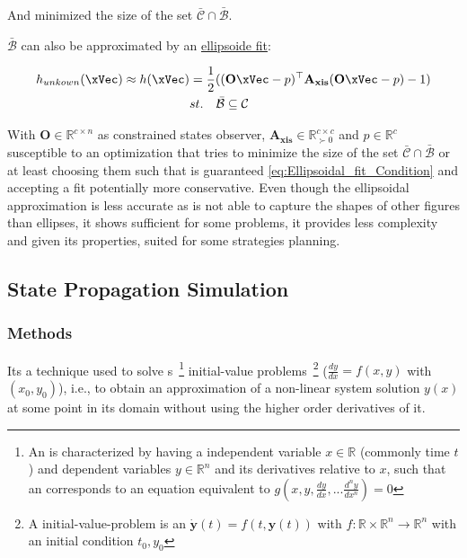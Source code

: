 And minimized the size of the set \(\bar{\mathcal{C} }\cap \bar{\mathcal{B}}\). \par
\(\bar{\mathcal{B}}\) can also be approximated by an \underline{ellipsoide fit}:

\begin{align}
        h_{unkown}(\xVec) \approx h(\xVec) &= \frac{1}{2}((\mathbf{O}\xVec - p)^{\top}\mathbf{A_{xis}}(\mathbf{O}\xVec - p) - 1) \label{eq:Ellipsoidal_fit} \\
        &st. \quad \bar{\mathcal{B}} \subseteq \mathcal{C} \label{eq:Ellipsoidal_fit_Condition}
\end{align}

With \(\mathbf{O} \in \mathbb{R}^{c \times n}\) as constrained states observer, \(\mathbf{A_{xis}} \in \mathbb{R}^{c \times c}_{\succ 0}\) and \(p \in \mathbb{R}^{c}\) susceptible to an optimization that tries to minimize the size of the set \(\bar{\mathcal{C} }\cap \bar{\mathcal{B}}\) or at least choosing them such that is guaranteed \eqref{eq:Ellipsoidal_fit_Condition} and accepting a fit potentially more conservative. Even though the ellipsoidal approximation is less accurate as is not able to capture the shapes of other figures than ellipses, it shows sufficient for some problems, it provides less complexity and given its properties, suited for some strategies planning. \\


\subsection{State Propagation Simulation}
\label{subsub:State_Propagation_Simulation_Algorithm}

\subsubsection{ Methods}
\label{subsub:Runge-Kutta_Methods}

Its a technique used to solve s~\footnote{An  is characterized by having a independent variable \(x \in \mathbb{R}\) (commonly time \(t\)) and dependent variables \(y \in \mathbb{R}^n\) and its derivatives relative to \(x\), such that an  corresponds to an equation equivalent to \(g(x,y, \frac{dy}{dx}, ... \frac{d^{n}y}{dx^n})= 0\)  } initial-value problems~\footnote{A initial-value-problem is an  \(\dot{\mathbf{y}}(t) = f(t, \mathbf{y}(t))\) with \( f: \mathbb{R} \times \mathbb{R}^n \to \mathbb{R}^n\) with an initial condition \(t_0,y_0\)} (\(\frac{dy}{dx} = f(x,y)\) with \((x_0, y_0)\)), i.e., to obtain an approximation of a non-linear system solution \(y(x)\) at some point in its domain without using the higher order derivatives of it. \\

